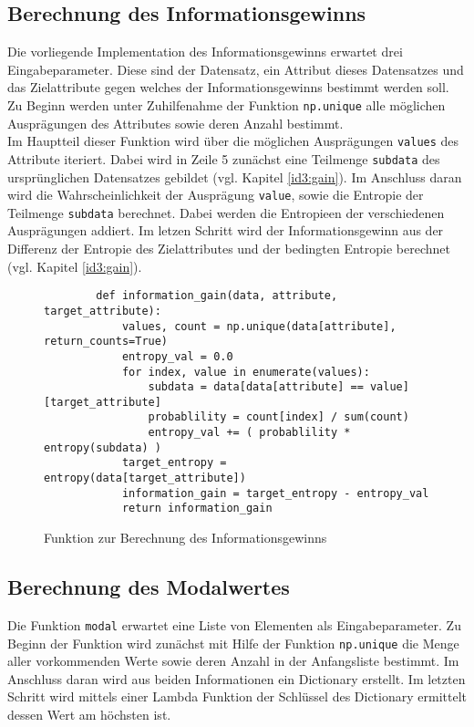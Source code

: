 \subsection{Berechnung des Informationsgewinns}
\label{id3:implementation-ig}
Die vorliegende Implementation des Informationsgewinns erwartet drei Eingabeparameter. Diese sind der Datensatz, ein Attribut dieses Datensatzes und das Zielattribute gegen welches der Informationsgewinns bestimmt werden soll. Zu Beginn werden unter Zu­hil­fe­nah­me der Funktion \texttt{np.unique} alle möglichen Ausprägungen des Attributes sowie deren Anzahl bestimmt.\\
Im Hauptteil dieser Funktion wird über die möglichen Ausprägungen \texttt{values} des Attribute iteriert. Dabei wird in Zeile 5 zunächst eine Teilmenge \texttt{subdata} des ursprünglichen Datensatzes gebildet (vgl. Kapitel \ref{id3:gain}). Im Anschluss daran wird die Wahrscheinlichkeit der Ausprägung \texttt{value}, sowie die Entropie der Teilmenge \texttt{subdata} berechnet. Dabei werden die Entropieen der verschiedenen Ausprägungen addiert. Im letzen Schritt wird der Informationsgewinn aus der Differenz der Entropie des Zielattributes und der bedingten Entropie berechnet (vgl. Kapitel \ref{id3:gain}).

\begin{figure}[htbp]
    \centering
    \begin{verbatim}
        def information_gain(data, attribute, target_attribute):
            values, count = np.unique(data[attribute], return_counts=True)
            entropy_val = 0.0
            for index, value in enumerate(values):
                subdata = data[data[attribute] == value][target_attribute]
                probablility = count[index] / sum(count)
                entropy_val += ( probablility * entropy(subdata) )
            target_entropy = entropy(data[target_attribute])
            information_gain = target_entropy - entropy_val
            return information_gain
    \end{verbatim}
    \caption{Funktion zur Berechnung des Informationsgewinns \autocites{PythonCourseDecisionTrees:online}{ImplementationID3}}
\end{figure}

\subsection{Berechnung des Modalwertes}
\label{id3:implementation-modal}
Die Funktion \texttt{modal} erwartet eine Liste von Elementen als Eingabeparameter. Zu Beginn der Funktion wird zunächst mit Hilfe der Funktion \texttt{np.unique} die Menge aller vorkommenden Werte sowie deren Anzahl in der Anfangsliste bestimmt. Im Anschluss daran wird aus beiden Informationen ein Dictionary erstellt. Im letzten Schritt wird mittels einer Lambda Funktion der Schlüssel des Dictionary ermittelt dessen Wert am höchsten ist.

